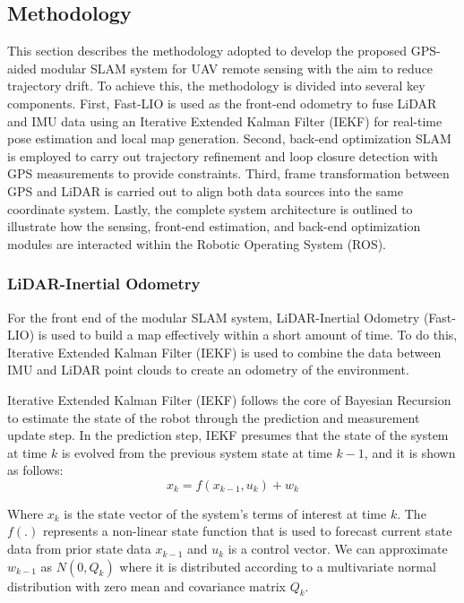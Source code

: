 \documentclass[12pt, a4paper]{article}
\begin{document}
\subsection{Methodology}
This section describes the methodology adopted to develop the proposed GPS-aided modular SLAM system for UAV remote sensing with the aim to reduce trajectory drift. To achieve this, the methodology is divided into several key components. First, Fast-LIO is used as the front-end odometry to fuse LiDAR and IMU data using an Iterative Extended Kalman Filter (IEKF) for real-time pose estimation and local map generation. Second, back-end optimization SLAM is employed to carry out trajectory refinement and loop closure detection with GPS measurements to provide constraints. Third, frame transformation between GPS and LiDAR is carried out to align both data sources into the same coordinate system. Lastly, the complete system architecture is outlined to illustrate how the sensing, front-end estimation, and back-end optimization modules are interacted within the Robotic Operating System (ROS).

\subsubsection{LiDAR-Inertial Odometry}
For the front end of the modular SLAM system, LiDAR-Inertial Odometry (Fast-LIO)
is used to build a map effectively within a short amount of time. To do this,
Iterative Extended Kalman Filter (IEKF) is used to combine the data between IMU and LiDAR
point clouds to create an odometry of the environment. 

Iterative Extended Kalman Filter (IEKF) follows the core of Bayesian Recursion
to estimate the state of the robot through the prediction and measurement update
step. In the prediction step, IEKF presumes that the state of the system at time
$k$ is evolved from the previous system state at time $k-1$, and it is shown as
follows:
\begin{equation}
    x_k = f(x_{k-1},u_k) + w_{k} 
\end{equation}

Where $x_k$ is the state vector of the system's terms of interest at time $k$.
The $f(.)$ represents a non-linear state function that is used to forecast
current state data from prior state data $x_{k-1}$ and $u_k$ is a control
vector. We can approximate $w_{k-1}$ as $N(0,Q_k)$ where it is distributed
according to a multivariate normal distribution with zero mean and covariance
matrix $Q_k$.
\end{document}
